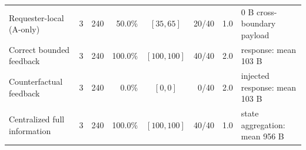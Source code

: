 \begin{tabularx}{\textwidth}{@{}Z r r r c r r Z@{}}
  \toprule
   &  &  &  &  &  &  &  \\
  \midrule
  Requester-local (A-only) & 3 & 240 & 50.0\% & $[35,65]$ & 20/40 & 1.0 & 0 B cross-boundary payload \\
  Correct bounded feedback & 3 & 240 & 100.0\% & $[100,100]$ & 40/40 & 2.0 & response: mean 103 B \\
  Counterfactual feedback & 3 & 240 & 0.0\% & $[0,0]$ & 0/40 & 2.0 & injected response: mean 103 B \\
  Centralized full information & 3 & 240 & 100.0\% & $[100,100]$ & 40/40 & 1.0 & state aggregation: mean 956 B \\
  \bottomrule
\end{tabularx}
